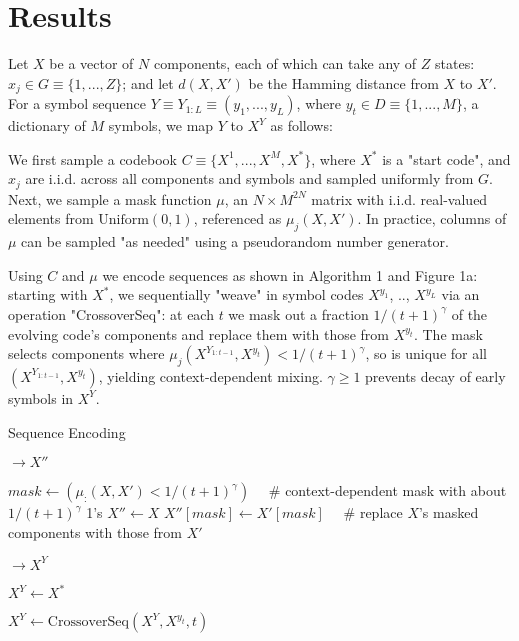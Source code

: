 \documentclass{article}
\begin{document}
\section{Results}

Let $X$ be a vector of $N$ components, each of which can take any of $Z$ states: $x_j \in G \equiv \{1,...,Z\}$; and let $d(X, X')$ be the Hamming distance from $X$ to $X'$. For a symbol sequence $Y \equiv Y_{1:L} \equiv (y_1, ..., y_L)$, where $y_t \in D \equiv \{1, ..., M\}$, a dictionary of $M$ symbols, we map $Y$ to $X^Y$ as follows:

We first sample a codebook $C \equiv \{X^1, ..., X^M, X^*\}$, where $X^*$ is a "start code", and $x_j$ are i.i.d. across all components and symbols and sampled uniformly from $G$. Next, we sample a mask function $\mu$, an $N \times M^{2N}$ matrix with i.i.d. real-valued elements from $\textrm{Uniform}(0, 1)$, referenced as $\mu_j(X, X')$. In practice, columns of $\mu$ can be sampled "as needed" using a pseudorandom number generator.

Using $C$ and $\mu$ we encode sequences as shown in Algorithm 1 and Figure 1a: starting with $X^*$, we sequentially "weave" in symbol codes $X^{y_1}$, .., $X^{y_L}$ via an operation "CrossoverSeq": at each $t$ we mask out a fraction $1/(t+1)^\gamma$ of the evolving code's components and replace them with those from $X^{y_t}$. The mask selects components where $\mu_j(X^{Y_{1:t-1}}, X^{y_t}) < 1/(t+1)^\gamma$, so is unique for all $(X^{Y_{1:t-1}}, X^{y_t})$, yielding context-dependent mixing. $\gamma \geq 1$ prevents decay of early symbols in $X^Y$.

\begin{algorithm}
\caption{Sequence Encoding}
\label{alg:1}

\begin{algorithmic}[0]
 $\rightarrow X''$

\State $mask \gets (\mu_:(X, X') < 1/(t+1)^\gamma) \quad$  \# context-dependent mask with about $1/(t+1)^\gamma$ 1's
\State $X'' \gets X$
\State $X''[mask] \gets X'[mask] \quad$  \# replace $X$'s masked components with those from $X'$

\EndFunction

 $\rightarrow X^Y$

\State $X^Y \gets X^*$

\State $X^Y \gets \textrm{CrossoverSeq}(X^Y, X^{y_t}, t)$

\EndFor

\EndFunction

\end{algorithmic}
\end{algorithm}
\end{document}
